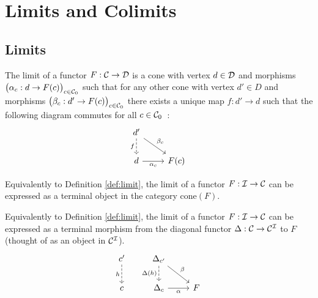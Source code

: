\section{Limits and Colimits}

\subsection{Limits}

\begin{definition}
	The limit of a functor $F:\mathcal{C}\to \mathcal{D}$ is a cone with vertex $d\in \mathcal{D}$ and
	morphisms $\big(\alpha_c: d \to F(c)\big)_{c\in \mathcal{C}_0}$ such that for any other
	cone with vertex $d'\in D$ and morphisms $\big(\beta_c: d' \to F(c)\big)_{c\in
	\mathcal{C}_0}$ there exists a unique map $f:d'\to d$ such that the following diagram
	commutes for all $c\in \mathcal{C}_0$~\parencite{leinster:basic_category_theory}:
	\[\begin{tikzcd}
		{d'} \\
		d & {F(c)}
		\arrow["{\alpha_c}"', from=2-1, to=2-2]
		\arrow["{\beta_c}", from=1-1, to=2-2]
		\arrow["f"', dashed, from=1-1, to=2-1]
	\end{tikzcd}\]
\end{definition}

\begin{definition}
	Equivalently to Definition \ref{def:limit}, the limit of a functor $F:\mathcal{I}\to
	\mathcal{C}$ can be expressed as a terminal object in the category $\mathrm{cone}(F)$.
\end{definition}

\begin{definition}
	Equivalently to Definition \ref{def:limit}, the limit of a functor $F:\mathcal{I}\to
	\mathcal{C}$ can be expressed as a terminal morphism from the diagonal functor $\Delta:
	\mathcal{C} \to \mathcal{C}^{\mathcal{I}}$ to $F$ (thought of as an object in $\mathcal{C}^{\mathcal{I}}$).
	\[\begin{tikzcd}[ampersand replacement=\&]
		{c'} \& {\Delta_{c'}} \\
		c \& {\Delta_c} \& F
		\arrow["h"', dashed, from=1-1, to=2-1]
		\arrow["{\Delta(h)}"', dashed, from=1-2, to=2-2]
		\arrow["\beta", from=1-2, to=2-3]
		\arrow["\alpha"', from=2-2, to=2-3]
	\end{tikzcd}\]
\end{definition}

